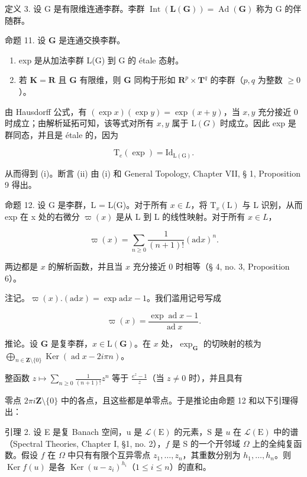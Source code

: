 定义 3. 设 G 是有限维连通李群。李群 \(\operatorname{Int}(\mathbf{L}(\mathbf{G})) = \operatorname{Ad}(\mathbf{G})\) 称为 G 的伴随群。

命题 11. 设 \(\mathbf{G}\) 是连通交换李群。

\begin{enumerate}
\def\labelenumi{(\roman{enumi})}
\item
  exp 是从加法李群 L(G) 到 G 的 étale 态射。
\item
  若 \(\mathbf{K} = \mathbf{R}\) 且 \(\mathbf{G}\) 有限维，则 \(\mathbf{G}\) 同构于形如 \(\mathbf{R}^p \times \mathbf{T}^q\) 的李群（\(p, q\) 为整数 \(\geqslant 0\)）。
\end{enumerate}

由 Hausdorff 公式，有 \((\exp x)(\exp y) = \exp (x + y)\)，当 \(x,y\) 充分接近 0 时成立；由解析延拓可知，该等式对所有 \(x,y\) 属于 \(\mathrm{L}(G)\) 时成立。因此 exp 是群同态，并且是 étale 的，因为

\[
\mathrm{T} _ {e} (\exp) = \mathrm{Id} _ {\mathrm{L(G)}}.
\]

从而得到 (i)。断言 (ii) 由 (i) 和 General Topology, Chapter VII, § 1, Proposition 9 得出。

命题 12. 设 G 是李群，L = L(G)。对于所有 \(x \in L\)，将 \(\mathrm{T}_{x}(\mathrm{L})\) 与 L 识别，从而 exp 在 x 处的右微分 \(\varpi(x)\) 是从 L 到 L 的线性映射。对于所有 \(x \in L\)，

\[
\varpi (x) = \sum_ {n \geqslant 0} \frac {1}{(n + 1) !} (\mathrm{ad} x) ^ {n}.
\]

两边都是 \(x\) 的解析函数，并且当 \(x\) 充分接近 0 时相等（§ 4, no. 3, Proposition 6）。

注记。\(\varpi(x) . (\mathrm{ad} x) = \exp \mathrm{ad} x - 1\)。我们滥用记号写成

\[
\varpi (x) = \frac {\exp \operatorname{ad} x - 1}{\operatorname{ad} x}.
\]

推论。设 \(\mathbf{G}\) 是复李群，\(x \in \mathrm{L}(\mathbf{G})\)。在 \(x\) 处，\(\exp_{\mathbf{G}}\) 的切映射的核为 \(\bigoplus_{n \in \mathbf{Z}\setminus\{0\}} \operatorname{Ker}(\operatorname{ad} x - 2i\pi n)\)。

整函数 \(z \mapsto \sum_{n \geqslant 0} \frac{1}{(n + 1)!} z^n\) 等于 \(\frac{e^z - 1}{z}\)（当 \(z \neq 0\) 时），并且具有

零点 \(2\pi i\mathbf{Z}\setminus\{0\}\) 中的各点，且这些都是单零点。于是推论由命题 12 和以下引理得出：

引理 2. 设 E 是复 Banach 空间，u 是 \(\mathcal{L}(\mathrm{E})\) 的元素，S 是 \(u\) 在 \(\mathcal{L}(\mathrm{E})\) 中的谱（Spectral Theories, Chapter I, §1, no. 2），\(f\) 是 S 的一个开邻域 \(\Omega\) 上的全纯复函数。假设 \(f\) 在 \(\Omega\) 中只有有限个互异零点 \(z_{1},\ldots ,z_{n}\)，其重数分别为 \(h_1,\dots,h_n\)。则 \(\operatorname {Ker}f(u)\) 是各 \(\operatorname {Ker}(u - z_i)^{h_i}\)（\(1\leqslant i\leqslant n\)）的直和。

